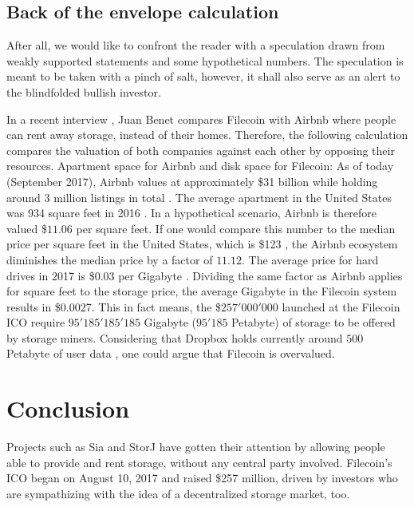 \documentclass[conference]{IEEEtran}
\begin{document}
\subsection{Back of the envelope calculation}

After all, we would like to confront the reader with a speculation drawn from weakly supported statements and some hypothetical numbers.
The speculation is meant to be taken with a pinch of salt, however, it shall also serve as an alert to the blindfolded bullish investor.

In a recent interview \cite{podcast}, Juan Benet compares Filecoin with Airbnb \cite{airbnb} where people can rent away storage, instead of their homes.
Therefore, the following calculation compares the valuation of both companies against each other by opposing their resources.
Apartment space for Airbnb and disk space for Filecoin:
As of today (September 2017), Airbnb values at approximately \$31 billion while holding around 3 million listings in total \cite{airbnb-valuation}.
The average apartment in the United States was 934 square feet in 2016 \cite{housing-cnbc}.
In a hypothetical scenario, Airbnb is therefore valued \$$11.06$ per square feet. 
If one would compare this number to the median price per square feet in the United States, which is \$123 \cite{home-prices}, the Airbnb ecosystem diminishes the median price by a factor of $11.12$.
The average price for hard drives in 2017 is \$0.03 per Gigabyte \cite{hard-drive}.
Dividing the same factor as Airbnb applies for square feet to the storage price, the average Gigabyte in the Filecoin system results in \$0.0027.
This in fact means, the \$$257'000'000$ launched at the Filecoin ICO require $95'185'185'185$ Gigabyte ($95'185$ Petabyte) of storage to be offered by storage miners.
Considering that Dropbox \cite{dropbox} holds currently around $500$ Petabyte of user data \cite{dropbox-userdata}, one could argue that Filecoin is overvalued.

\section{Conclusion}
\label{sec:conclusion}

Projects such as Sia and StorJ have gotten their attention by allowing people able to provide and rent storage, without any central party involved.
Filecoin's ICO began on August 10, 2017 and raised \$257 million, driven by investors who are sympathizing with the idea of a decentralized storage market, too.
\end{document}
